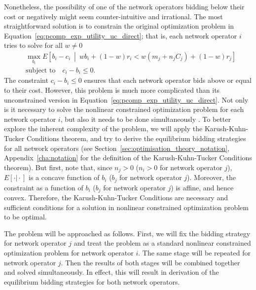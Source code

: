 Nonetheless, the possibility of one of the network operators bidding below their cost or negatively might seem counter-intuitive and irrational. The most straightforward solution is to constrain the original optimization problem in Equation~\eqref{eq:pcomp_exp_utility_uc_direct}; that is, each network operator $i$ tries to solve for all $w\neq 0$
\begin{align}
	\label{eq:pcomp_exp_utility_c_direct}
	&\max_{b_i}E \left[ b_i-c_i \:\middle\vert\: wb_i + (1-w)r_i < w(m_j + n_j C_j) + (1-w)r_j\right]\\
	&\text{subject to}\quad c_i-b_i\le 0.\nonumber
\end{align}
The constraint $c_i-b_i\le 0$ ensures that each network operator bids above or equal to their cost. However, this problem is much more complicated than its unconstrained version in Equation~\eqref{eq:pcomp_exp_utility_uc_direct}. Not only is it necessary to solve the nonlinear constrained optimization problem for each network operator $i$, but also it needs to be done simultaneously \cite{Griffin2011}. To better explore the inherent complexity of the problem, we will apply the Karush-Kuhn-Tucker Conditions theorem, and try to derive the equilibrium bidding strategies for all network operators (see Section~\ref{sec:optimisation_theory_notation}, Appendix~\ref{cha:notation} for the definition of the Karush-Kuhn-Tucker Conditions theorem). But first, note that, since $n_j>0$ ($n_i>0$ for network operator $j$), $E[\cdot \vert \cdot]$ is a concave function of $b_i$ ($b_j$ for network operator $j$). Moreover, the constraint as a function of $b_i$ ($b_j$ for network operator $j$) is affine, and hence convex. Therefore, the Karush-Kuhn-Tucker Conditions are necessary and sufficient conditions for a solution in nonlinear constrained optimization problem to be optimal.

The problem will be approached as follows. First, we will fix the bidding strategy for network operator $j$ and treat the problem as a standard nonlinear constrained optimization problem for network operator $i$. The same stage will be repeated for network operator $j$. Then the results of both stages will be combined together and solved simultaneously. In effect, this will result in derivation of the equilibrium bidding strategies for both network operators.

